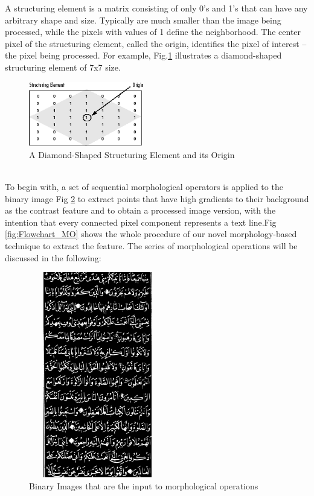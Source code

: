 \noindent
A structuring element is a matrix consisting of only 0's and 1's that can have any arbitrary shape and size. Typically are much smaller than the image being processed, while the pixels with values of 1 define the neighborhood. The center pixel of the structuring element, called the origin, identifies the pixel of interest – the pixel being processed.
\noindent
For example, Fig.\ref{fig:structuring-element} illustrates a diamond-shaped structuring element of 7x7 size.
\begin{figure}[!htb]
    \centering
    \includegraphics[width=5cm]{images/SE.png}
    \caption{A Diamond-Shaped Structuring Element and its Origin}
    \label{fig:structuring-element}
\end{figure} \\


To begin with, a set of sequential morphological operators is applied to the binary image Fig \ref{fig:input_binary_img} to extract points that have high gradients to their background as the contrast feature and to obtain a processed image version, with the intention that every connected pixel component represents a text line.Fig \ref{fig:Flowchart_MO} shows the whole procedure of our novel morphology-based technique to extract the feature. The series of morphological operations will be discussed in the following:%
\begin{figure}[H]
    \centering
    \includegraphics[width=6cm, height=9cm]{images/input.png}
    \caption{Binary Images that are the input to morphological operations}
    \label{fig:input_binary_img}
\end{figure}

